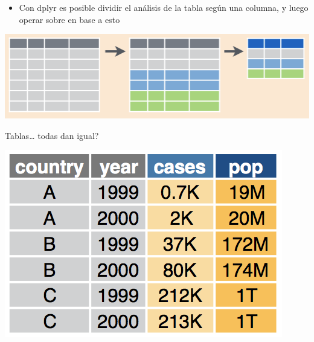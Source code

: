\documentclass[ignorenonframetext,]{beamer}
\providecommand{\tightlist}{%
  \setlength{\itemsep}{0pt}\setlength{\parskip}{0pt}}
\begin{document}
\begin{frame}{}
\protect\hypertarget{section-4}{}


\begin{itemize}
\tightlist
\item
  Con dplyr es posible dividir el análisis de la tabla según una
  columna, y luego operar sobre en base a esto
\end{itemize}

\begin{center}\includegraphics[width=1\linewidth]{dplyr_groupBy_summarise} \end{center}

\end{frame}

\begin{frame}{Tablas\ldots{} todas dan igual?}
\protect\hypertarget{tablas-todas-dan-igual}{}

\begin{center}\includegraphics[width=0.7\linewidth]{data_wide} \end{center}

\end{frame}
\end{document}
